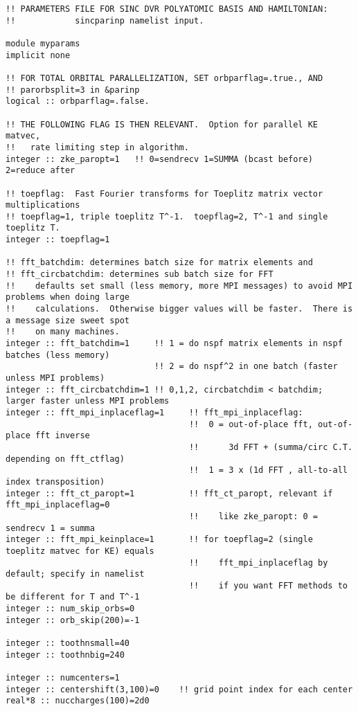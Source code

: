 \begin{verbatim}
!! PARAMETERS FILE FOR SINC DVR POLYATOMIC BASIS AND HAMILTONIAN:
!!            sincparinp namelist input.

module myparams
implicit none

!! FOR TOTAL ORBITAL PARALLELIZATION, SET orbparflag=.true., AND
!! parorbsplit=3 in &parinp
logical :: orbparflag=.false.

!! THE FOLLOWING FLAG IS THEN RELEVANT.  Option for parallel KE matvec,
!!   rate limiting step in algorithm.
integer :: zke_paropt=1   !! 0=sendrecv 1=SUMMA (bcast before) 2=reduce after

!! toepflag:  Fast Fourier transforms for Toeplitz matrix vector multiplications
!! toepflag=1, triple toeplitz T^-1.  toepflag=2, T^-1 and single toeplitz T. 
integer :: toepflag=1

!! fft_batchdim: determines batch size for matrix elements and 
!! fft_circbatchdim: determines sub batch size for FFT 
!!    defaults set small (less memory, more MPI messages) to avoid MPI problems when doing large 
!!    calculations.  Otherwise bigger values will be faster.  There is a message size sweet spot
!!    on many machines.
integer :: fft_batchdim=1     !! 1 = do nspf matrix elements in nspf batches (less memory)
                              !! 2 = do nspf^2 in one batch (faster unless MPI problems)
integer :: fft_circbatchdim=1 !! 0,1,2, circbatchdim < batchdim; larger faster unless MPI problems
integer :: fft_mpi_inplaceflag=1     !! fft_mpi_inplaceflag:
                                     !!  0 = out-of-place fft, out-of-place fft inverse
                                     !!      3d FFT + (summa/circ C.T. depending on fft_ctflag)
                                     !!  1 = 3 x (1d FFT , all-to-all index transposition)
integer :: fft_ct_paropt=1           !! fft_ct_paropt, relevant if fft_mpi_inplaceflag=0
                                     !!    like zke_paropt: 0 = sendrecv 1 = summa
integer :: fft_mpi_keinplace=1       !! for toepflag=2 (single toeplitz matvec for KE) equals 
                                     !!    fft_mpi_inplaceflag by default; specify in namelist
                                     !!    if you want FFT methods to be different for T and T^-1
integer :: num_skip_orbs=0
integer :: orb_skip(200)=-1

integer :: toothnsmall=40
integer :: toothnbig=240

integer :: numcenters=1
integer :: centershift(3,100)=0    !! grid point index for each center
real*8 :: nuccharges(100)=2d0


\end{verbatim}
